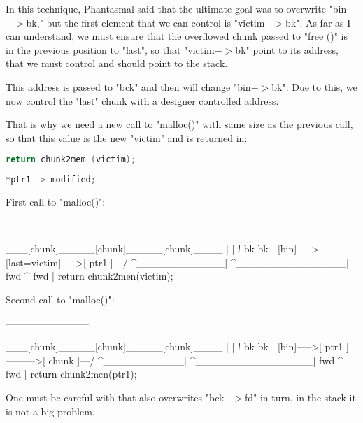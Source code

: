 \documentclass[12pt]{article}
\begin{document}
In this technique, Phantasmal said that the ultimate goal was to overwrite
"bin$->$bk," but the first element that we can control is "victim$->$bk".  As
far as I can understand, we must ensure that the overflowed chunk passed
to "free ()" is in the previous position to "last", so that "victim$->$bk"
point to its address, that we must control and should point to the stack.
\newline


This address is passed to "bck" and then will change "bin$->$bk". Due to
this, we now control the "last" chunk with a designer controlled address.
\newline


That is why we need a new call to "malloc()" with same size as the
previous call, so that this value is the new "victim" and is returned in:
\begin{lstlisting}[language=C]
     return chunk2mem (victim);
\end{lstlisting}


\begin{lstlisting}[language=C]
     *ptr1 -> modified;
\end{lstlisting}
     First call to "malloc()":
 \begin{verbnobox}[\small]
     -------------------------

         ___[chunk]_____[chunk]_____[chunk]____ 
        |                                      |
        !    bk                 bk             |
      [bin]----->[last=victim]----->[ ptr1 ]---/
        ^____________| ^_______________|
             fwd      ^       fwd
                      |
        return chunk2men(victim);
\end{verbnobox}


     Second call to "malloc()":
\begin{verbnobox}[\small]
     --------------------------

         ___[chunk]_____[chunk]_____[chunk]____ 
        |                                      |
        !    bk              bk                |
      [bin]----->[ ptr1 ]--------->[ chunk ]---/
        ^___________| ^________________|
             fwd     ^       fwd
                     |
        return chunk2men(ptr1);
\end{verbnobox}



One must be careful with that also overwrites "bck$->$fd" in turn, in the
stack it is not a big problem.
\newline
\end{document}
